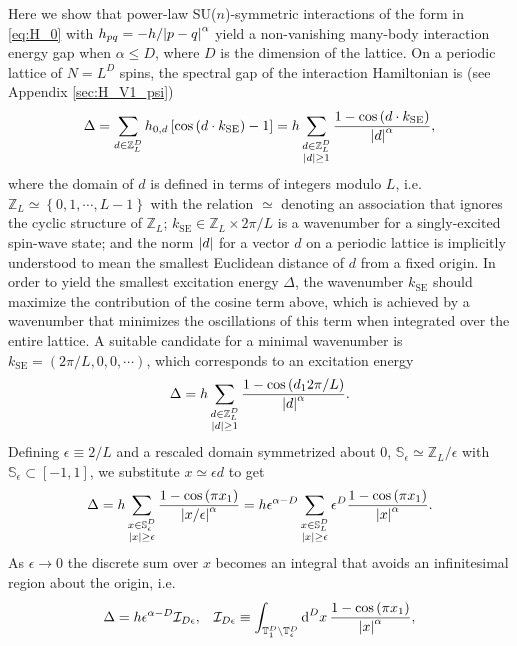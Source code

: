 \documentclass[nofootinbib,notitlepage,11pt]{revtex4-2}
\renewcommand{\t}{\text} %
\newcommand{\f}[2]{\dfrac{#1}{#2}} %
\newcommand{\p}[1]{\left(#1\right)} %
\renewcommand{\sp}[1]{\left[#1\right]} %
\renewcommand{\set}[1]{\left\{#1\right\}} %
\renewcommand{\c}{\cdot} %
\newcommand{\1}{\mathds{1}}
\renewcommand{\d}{\text{d}}
\newcommand{\I}{\mathcal{I}}
\renewcommand{\SS}{\mathbb{S}}
\newcommand{\TT}{\mathbb{T}}
\newcommand{\ZZ}{\mathbb{Z}}
\begin{document}
Here we show that power-law SU($n$)-symmetric interactions of the form
in \eqref{eq:H_0} with $h_{pq}=-h/\abs{p-q}^\alpha$ yield a
non-vanishing many-body interaction energy gap when $\alpha\le D$,
where $D$ is the dimension of the lattice.  On a periodic lattice of
$N=L^D$ spins, the spectral gap of the interaction Hamiltonian is (see
Appendix \ref{sec:H_V1_psi})
\begin{align}
  \Delta
  = \sum_{d\in\ZZ_L^D} h_{0,d} \sp{\cos\p{d \c k_{\t{SE}}}-1}
  = h \sum_{\substack{d\in\ZZ_L^D\\\abs{d}\ge1}}
  \f{1-\cos\p{d \c k_{\t{SE}}}}{\abs{d}^\alpha},
\end{align}
where the domain of $d$ is defined in terms of integers modulo $L$,
i.e.~$\ZZ_L\simeq\set{0,1,\cdots,L-1}$ with the relation $\simeq$
denoting an association that ignores the cyclic structure of $\ZZ_L$;
$k_{\t{SE}}\in\ZZ_L\times2\pi/L$ is a wavenumber for a singly-excited
spin-wave state; and the norm $\abs{d}$ for a vector $d$ on a periodic
lattice is implicitly understood to mean the smallest Euclidean
distance of $d$ from a fixed origin.  In order to yield the smallest
excitation energy $\Delta$, the wavenumber $k_{\t{SE}}$ should
maximize the contribution of the cosine term above, which is achieved
by a wavenumber that minimizes the oscillations of this term when
integrated over the entire lattice.  A suitable candidate for a
minimal wavenumber is $k_{\t{SE}}=\p{2\pi/L,0,0,\cdots}$, which
corresponds to an excitation energy
\begin{align}
  \Delta = h \sum_{\substack{d\in\ZZ_L^D\\\abs{d}\ge1}}
  \f{1-\cos\p{d_12\pi/L}}{\abs{d}^\alpha}.
\end{align}
Defining $\epsilon\equiv2/L$ and a rescaled domain symmetrized about
$0$, $\SS_\epsilon\simeq\ZZ_L/\epsilon$ with
$\SS_\epsilon\subset\sp{-1,1}$, we substitute $x\simeq\epsilon d$ to
get
\begin{align}
  \Delta
  = h \sum_{\substack{x\in\SS_\epsilon^D\\\abs{x}\ge\epsilon}}
  \f{1-\cos\p{\pi x_1}}{\abs{x/\epsilon}^\alpha}
  = h \epsilon^{\alpha-D} \sum_{\substack{x\in\SS_L^D\\\abs{x}\ge\epsilon}}
  \epsilon^D \f{1-\cos\p{\pi x_1}}{\abs{x}^\alpha}.
\end{align}
As $\epsilon\to0$ the discrete sum over $x$ becomes an integral that
avoids an infinitesimal region about the origin, i.e.
\begin{align}
  \Delta = h \epsilon^{\alpha-D} \I_{D\epsilon},
  &&
  \I_{D\epsilon}
  \equiv \int_{\TT_1^D\setminus\TT_\epsilon^D} \d^Dx\,
  \f{1-\cos\p{\pi x_1}}{\abs{x}^\alpha},
\end{align}
\end{document}
